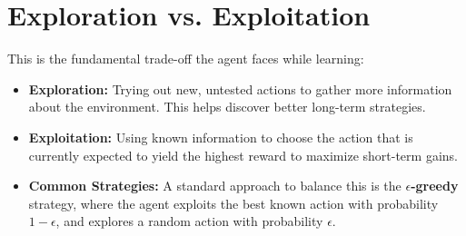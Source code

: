 \documentclass[12pt]{article}
\begin{document}
\section*{Exploration vs. Exploitation}
This is the fundamental trade-off the agent faces while learning:
\begin{itemize}[label=$\bullet$]
    \item \textbf{Exploration:} Trying out new, untested actions to gather more information about the environment. This helps discover better long-term strategies.
    \item \textbf{Exploitation:} Using known information to choose the action that is currently expected to yield the highest reward to maximize short-term gains.
    \item \textbf{Common Strategies:} A standard approach to balance this is the \textbf{$\epsilon$-greedy} strategy, where the agent exploits the best known action with probability $1-\epsilon$, and explores a random action with probability $\epsilon$.
\end{itemize}
\end{document}
